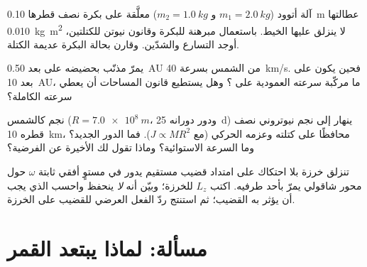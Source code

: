 \begin{exercise}[$\star\star$]\label{exo:b1:angular-momentum:9}
آلة أتوود ($m_1 = \qty{2.0}{kg}$ و $m_2 = \qty{1.0}{kg}$) معلَّقة على
بكرة نصف قطرها \qty{0.10}{m}  عطالتها \qty{0.010}{kg.m^2}
لا ينزلق عليها الخيط. باستعمال مبرهنة 
للبكرة وقانون نيوتن للكتلتين، أوجد التسارع
والشدّين. وقارن بحالة البكرة عديمة الكتلة.
\end{exercise}

\begin{exercise}[$\star\star\star$]\label{exo:b1:angular-momentum:10}
يمرّ مذنّب بحضيضه على بعد \qty{0.50}{AU} من الشمس بسرعة
\qty{40}{km/s}. فحين يكون على بعد \qty{10}{AU}، ما مركّبة
سرعته العمودية على ؟ وهل يستطيع قانون المساحات
أن يعطي سرعته الكاملة؟
\end{exercise}

\begin{exercise}[$\star\star\star$]\label{exo:b1:angular-momentum:11}
نجم كالشمس ($R = \qty{7.0e8}{m}$، ودور دورانه \qty{25}{d})
ينهار إلى نجم نيوتروني نصف قطره \qty{10}{km}، محافظًا على كتلته
وعزمه الحركي (مع $J \propto MR^2$). فما الدور الجديد؟ وما السرعة الاستوائية؟
وماذا تقول لك الأخيرة عن الفرضية؟
\end{exercise}

\begin{exercise}[$\star\star\star$]\label{exo:b1:angular-momentum:12}
تنزلق خرزة بلا احتكاك على امتداد قضيب مستقيم يدور في
مستوٍ أفقي  ثابتة $\omega$ حول محور شاقولي يمرّ بأحد
طرفيه. اكتب $L_z$ للخرزة؛ وبيّن أنه \emph{لا} ينحفظ
واحسب  الذي يجب أن يؤثر به القضيب؛ ثم استنتج ردّ الفعل العرضي
للقضيب على الخرزة.
\end{exercise}

\section{مسألة: لماذا يبتعد القمر}


